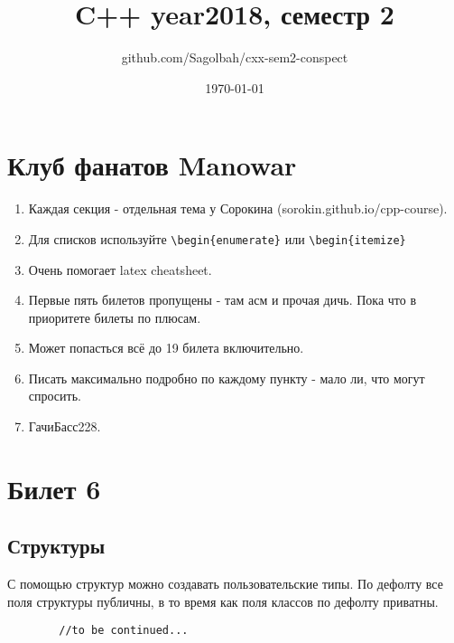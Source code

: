 \documentclass[15pt, a4paper]{article}
\title{C++ year2018, семестр 2}
\author{github.com/Sagolbah/cxx-sem2-conspect}
\date{\today}
\newcommand{\nl}{\newline}
\begin{document}
	\section{Клуб фанатов Manowar}
	\begin{enumerate}
		\item Каждая секция - отдельная тема у Сорокина (sorokin.github.io/cpp-course).
		\item Для списков используйте \verb|\begin{enumerate}| или \verb|\begin{itemize}| 
		\item Очень помогает latex cheatsheet.
        \item Первые пять билетов пропущены - там асм и прочая дичь. Пока что в приоритете билеты по плюсам.
        \item Может попасться всё до 19 билета включительно.
        \item Писать максимально подробно по каждому пункту - мало ли, что могут спросить.
        \item ГачиБасс228.
    \end{enumerate}
 
    \section{Билет 6}
    \subsection{Структуры}
    С помощью структур можно создавать пользовательские типы. По дефолту все поля структуры публичны,
    в то время как поля классов по дефолту приватны. \nl
    \begin{verbatim}
        //to be continued...
    \end{verbatim}
\end{document}

